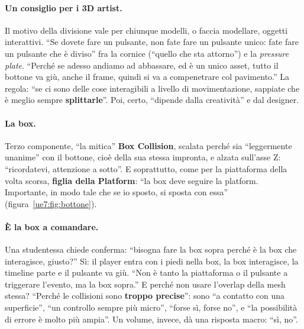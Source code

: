 \paragraph{Un consiglio per i 3D artist.} Il motivo della divisione vale per chiunque
modelli, o faccia modellare, oggetti interattivi. ``Se dovete fare un pulsante, non fate
fare un pulsante unico: fate fare un pulsante che è diviso'' fra la cornice (``quello che
sta attorno'') e la \emph{pressure plate}. ``Perché se adesso andiamo ad abbassare, ed è
un unico asset, tutto il bottone va giù, anche il frame, quindi si va a compenetrare col
pavimento.'' La regola: ``se ci sono delle cose interagibili a livello di movimentazione,
sappiate che è meglio sempre \textbf{splittarle}''. Poi, certo, ``dipende dalla
creatività'' e dal designer.

\paragraph{La box.} Terzo componente, ``la mitica'' \textbf{Box Collision}, scalata
perché sia ``leggermente unanime'' con il bottone, cioè della sua stessa impronta, e
alzata sull'asse Z: ``ricordatevi, attenzione a sotto''. E soprattutto, come per la
piattaforma della volta scorsa, \textbf{figlia della Platform}: ``la box deve seguire la
platform. Importante, in modo tale che se io sposto, si sposta con essa''
(figura~\ref{ue7:fig:bottone}).

\paragraph{È la box a comandare.} Una studentessa chiede conferma: ``bisogna fare la box
sopra perché è la box che interagisce, giusto?'' Sì: il player entra con i piedi nella
box, la box interagisce, la timeline parte e il pulsante va giù. ``Non è tanto la
piattaforma o il pulsante a triggerare l'evento, ma la box sopra.'' E perché non usare
l'overlap della mesh stessa? ``Perché le collisioni sono \textbf{troppo precise}'': sono
``a contatto con una superficie'', ``un controllo sempre più micro'', ``forse sì, forse
no'', e ``la possibilità di errore è molto più ampia''. Un volume, invece, dà una
risposta macro: ``sì, no''.

